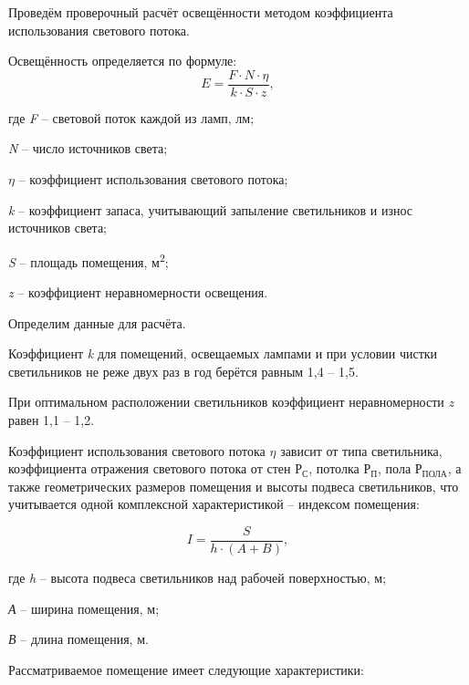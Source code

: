 Проведём проверочный расчёт освещённости методом коэффициента использования светового потока.

Освещённость определяется по формуле:
\begin{equation}
\label{eq:sunny}
E=\frac{F{\cdot}N{\cdot}\eta }{k{\cdot}S{\cdot}z},
\end{equation}

где \textit{F} – световой поток каждой из ламп, лм;

\textit{N} – число источников света;

\textit{$\eta $} – коэффициент использования светового потока;

\textit{k} – коэффициент запаса, учитывающий запыление светильников и износ источников света;

\textit{S} – площадь помещения, м\textsuperscript{2};

\textit{z} – коэффициент неравномерности освещения.

Определим данные для расчёта.

Коэффициент \textit{k} для помещений, освещаемых лампами и при условии чистки светильников не реже двух раз в год берётся равным 1,4 – 1,5.

При оптимальном расположении светильников коэффициент неравномерности \textit{z} равен 1,1 – 1,2.

Коэффициент использования светового потока $\eta$ зависит от типа светильника, коэффициента отражения светового потока от стен $\textit{Р}_{\textit{С}}$, потолка $\textit{Р}_{\textit{П}}$, пола $\textit{Р}_{\textit{ПОЛА}}$, а также геометрических размеров помещения и высоты подвеса светильников, что учитывается одной комплексной характеристикой – индексом помещения:

\begin{equation}
\label{eq:index_opt_flor}
I=\frac S{h{\cdot}(A+B)},
\end{equation}

где \textit{h} – высота подвеса светильников над рабочей поверхностью, м;

\textit{А} – ширина помещения, м;

\textit{В} – длина помещения, м.

Рассматриваемое помещение имеет следующие характеристики:

